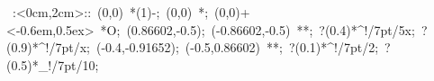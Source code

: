 %


\hbox{
\xy    <2cm,0cm>:<0cm,2cm>::
       (0,0) *\ellipse(1){-}; 
       (0,0) *{\bullet}; (0,0)+<-0.6em,0.5ex> *{O};
       (0.86602,-0.5); (-0.86602,-0.5) **\dir{-}; ?(0.4)*^!/7pt/{5x}; ?(0.9)*^!/7pt/{x};
       (-0.4,-0.91652); (-0.5,0.86602) **\dir{-}; ?(0.1)*^!/7pt/{2}; ?(0.5)*_!/7pt/{10};
\endxy}

